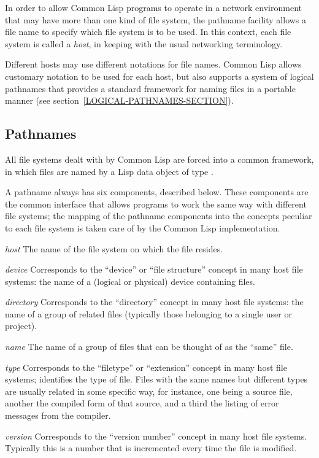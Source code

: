 In order to allow Common Lisp programs to operate in a network environment
that may have more than one kind of file system, the pathname facility
allows a file name to specify which file system is to be used.
In this context, each file system is called a \emph{host}, in keeping
with the usual networking terminology.

\begin{newer}
Different hosts may use different notations for file names.
Common Lisp allows customary notation to be used for each host, but
also supports
a system of logical pathnames that provides a standard framework for naming
files in a portable manner (see section~\ref{LOGICAL-PATHNAMES-SECTION}).
\end{newer}

\subsection{Pathnames}
\label{PATHNAME}
All file systems dealt with by Common Lisp are forced into a common framework,
in which files are named by a Lisp data object of type .

A pathname always has six components, described below.  These components
are the common interface that allows programs to work the same way with
different file systems; the mapping of the pathname components into the
concepts peculiar to each file system is taken care of by the Common Lisp
implementation.


\begin{flushdesc}
\item[\emph{host}]
The name of the file system on which the file resides.

\item[\emph{device}]
Corresponds to the ``device'' or ``file structure'' concept in many
host file systems: the name of a (logical or physical) device containing files.

\item[\emph{directory}]
Corresponds to the ``directory'' concept in many host file systems:
the name of a group of related files
(typically those belonging to a single
user or project).

\item[\emph{name}]
The name of a group of files that can be thought of as
the ``same'' file.

\item[\emph{type}]
Corresponds to the ``filetype'' or ``extension'' concept in many host
file systems; identifies the type of file.  Files with the same names
but different types are usually related in some specific way, for instance,
one being a source file, another the compiled form of that source,
and a third the listing of error messages from the compiler.

\item[\emph{version}]
Corresponds to the ``version number'' concept in many host file systems.
Typically this is a number that is incremented every time the file is modified.
\end{flushdesc}

